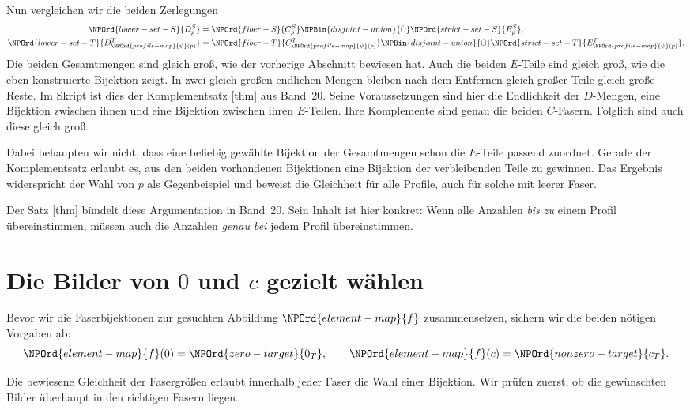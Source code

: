 Nun vergleichen wir die beiden Zerlegungen
\[
 \begin{aligned}
 \NPOrd{lower-set-S}{D_p^S}&=\NPOrd{fiber-S}{C_p^S}\NPBin{disjoint-union}{\dot\cup}\NPOrd{strict-set-S}{E_p^S},\\
 \NPOrd{lower-set-T}{D_{\NPOrd{profile-map}{\psi}(p)}^T}&=\NPOrd{fiber-T}{C_{\NPOrd{profile-map}{\psi}(p)}^T}\NPBin{disjoint-union}{\dot\cup}\NPOrd{strict-set-T}{E_{\NPOrd{profile-map}{\psi}(p)}^T}.
 \end{aligned}
\]
Die beiden Gesamtmengen sind gleich groß, wie der vorherige Abschnitt
bewiesen hat. Auch die beiden \(E\)-Teile sind gleich groß, wie die
eben konstruierte Bijektion zeigt. In zwei gleich großen endlichen
Mengen bleiben nach dem Entfernen gleich großer Teile gleich große
Reste. Im Skript ist dies der Komplementsatz
[thm] aus Band~20.
Seine Voraussetzungen sind hier die Endlichkeit der \(D\)-Mengen,
eine Bijektion zwischen ihnen und eine Bijektion zwischen ihren
\(E\)-Teilen. Ihre Komplemente sind genau die beiden \(C\)-Fasern.
Folglich sind auch diese gleich groß.

Dabei behaupten wir nicht, dass eine beliebig gewählte Bijektion
der Gesamtmengen schon die \(E\)-Teile passend zuordnet.
Gerade der Komplementsatz erlaubt es, aus den beiden vorhandenen
Bijektionen eine Bijektion der verbleibenden Teile zu gewinnen.
Das Ergebnis widerspricht der Wahl von \(p\) als Gegenbeispiel und
beweist die Gleichheit für alle Profile, auch für solche mit leerer Faser.

Der Satz [thm]
bündelt diese Argumentation in Band~20. Sein Inhalt ist hier konkret:
Wenn alle Anzahlen \emph{bis zu} einem Profil übereinstimmen, müssen
auch die Anzahlen \emph{genau bei} jedem Profil übereinstimmen.

\section*{Die Bilder von \(0\) und \(c\) gezielt wählen}

Bevor wir die Faserbijektionen zur gesuchten Abbildung \(\NPOrd{element-map}{f}\)
zusammensetzen, sichern wir die beiden nötigen Vorgaben ab:
\[
 \NPOrd{element-map}{f}(0)=\NPOrd{zero-target}{0_T},\qquad \NPOrd{element-map}{f}(c)=\NPOrd{nonzero-target}{c_T}.
\]

Die bewiesene Gleichheit der Fasergrößen erlaubt innerhalb jeder
Faser die Wahl einer Bijektion. Wir prüfen zuerst, ob die
gewünschten Bilder überhaupt in den richtigen Fasern liegen.

